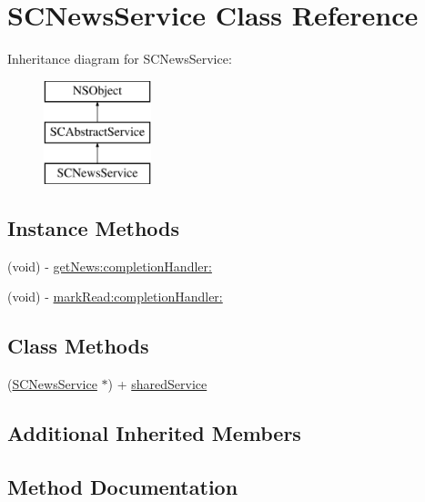 \hypertarget{interface_s_c_news_service}{}\section{S\+C\+News\+Service Class Reference}
\label{interface_s_c_news_service}
Inheritance diagram for S\+C\+News\+Service\+:\begin{figure}[H]
\begin{center}
\leavevmode
\includegraphics[height=3.000000cm]{interface_s_c_news_service}
\end{center}
\end{figure}
\subsection*{Instance Methods}
\begin{DoxyCompactItemize}
\item 
(void) -\/ \hyperlink{interface_s_c_news_service_af3a4641c83da76dec17cfc6ae3ac72c5}{get\+News\+:completion\+Handler\+:}
\item 
(void) -\/ \hyperlink{interface_s_c_news_service_ad716b7f9f4e914349d51a56a10ba425a}{mark\+Read\+:completion\+Handler\+:}
\end{DoxyCompactItemize}
\subsection*{Class Methods}
\begin{DoxyCompactItemize}
\item 
(\hyperlink{interface_s_c_news_service}{S\+C\+News\+Service} $\ast$) + \hyperlink{interface_s_c_news_service_ae0f19bdc45853071b5cb56e1b5e42647}{shared\+Service}
\end{DoxyCompactItemize}
\subsection*{Additional Inherited Members}


\subsection{Method Documentation}
